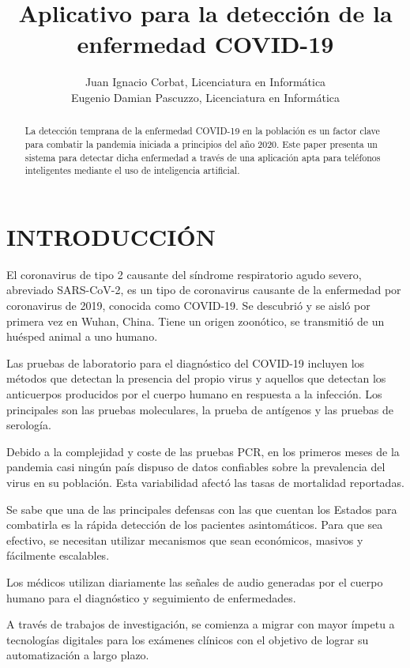 \documentclass[journal]{IEEEtran}
\title{Aplicativo para la detección de la enfermedad COVID-19}
\author{
Juan Ignacio Corbat, Licenciatura en Informática

Eugenio Damian Pascuzzo, Licenciatura en Informática}
\begin{document}
\maketitle

\begin{abstract}
La detección temprana de la enfermedad COVID-19 en la población es un factor clave para combatir la pandemia iniciada a principios del año 2020. Este paper presenta un sistema para detectar dicha enfermedad a través de una aplicación apta para teléfonos inteligentes mediante el uso de inteligencia artificial.
\end{abstract}

\section{INTRODUCCIÓN}
El coronavirus de tipo 2 causante del síndrome respiratorio agudo severo, abreviado SARS-CoV-2, es un tipo de coronavirus causante de la enfermedad por coronavirus de 2019, conocida como COVID-19. Se descubrió y se aisló por primera vez en Wuhan, China. Tiene un origen zoonótico, se transmitió de un huésped animal a uno humano\cite{covid-19-definición}.

Las pruebas de laboratorio para el diagnóstico del COVID-19 incluyen los métodos que detectan la presencia del propio virus y aquellos que detectan los anticuerpos producidos por el cuerpo humano en respuesta a la infección. Los principales son las pruebas moleculares, la prueba de antígenos y las pruebas de serología.

Debido a la complejidad y coste de las pruebas PCR, en los primeros meses de la pandemia casi ningún país dispuso de datos confiables sobre la prevalencia del virus en su población. Esta variabilidad afectó las tasas de mortalidad reportadas\cite{covid-19-overview}.

Se sabe que una de las principales defensas con las que cuentan los Estados para combatirla es la rápida detección de los pacientes asintomáticos. Para que sea efectivo, se necesitan utilizar mecanismos que sean económicos, masivos y fácilmente escalables.

Los médicos utilizan diariamente las señales de audio generadas por el cuerpo humano para el diagnóstico y seguimiento de enfermedades.

A través de trabajos de investigación, se comienza a migrar con mayor ímpetu a tecnologías digitales para los exámenes clínicos con el objetivo de lograr su automatización a largo plazo.
\end{document}
